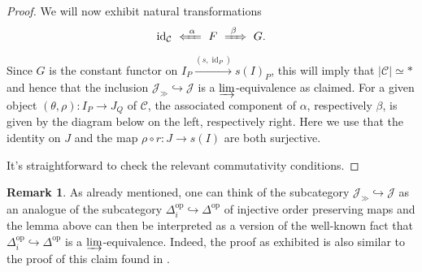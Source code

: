 \documentclass[12pt, reqno]{amsart}
\theoremstyle{plain}
\theoremstyle{definition}
\newtheorem{remark}[theorem]{Remark}
\begin{document}
\begin{proof}
We will now exhibit natural transformations
\begin{align*}
\operatorname{id}_{\mathcal{C}}\ \xLeftarrow{\ \alpha\ }\ F\  \xRightarrow{\ \beta \ } \ G.
\end{align*}
Since $G$ is the constant functor on $I_P\xrightarrow{(s,\operatorname{id}_P)} s(I)_P$, this will imply that $|\mathcal{C}|\simeq *$ and hence that the inclusion $\mathcal{J}_\gg\hookrightarrow \mathcal{J}$ is a $\varinjlim$-equivalence as claimed. For a given object $(\theta,\rho)\colon I_P\rightarrow J_Q$ of $\mathcal{C}$, the associated component of $\alpha$, respectively $\beta$, is given by the diagram below on the left, respectively right. Here we use that the identity on $J$ and the map $\rho\circ r\colon J\rightarrow s(I)$ are both surjective.
\begin{center}
\end{center}
It's straightforward to check the relevant commutativity conditions.
\end{proof}

\begin{remark}
As already mentioned, one can think of the subcategory $\mathcal{J}_\gg\hookrightarrow \mathcal{J}$ as an analogue of the subcategory $\Delta_i^{\operatorname{op}}\hookrightarrow \Delta^{\operatorname{op}}$ of injective order preserving maps and the lemma above can then be interpreted as a version of the well-known fact that $\Delta_i^{\operatorname{op}}\hookrightarrow \Delta^{\operatorname{op}}$ is a $\varinjlim$-equivalence. Indeed, the proof as exhibited is also similar to the proof of this claim found in \cite[Lemma 6.5.3.7]{LurieHTT}.
\end{remark}
\end{document}
